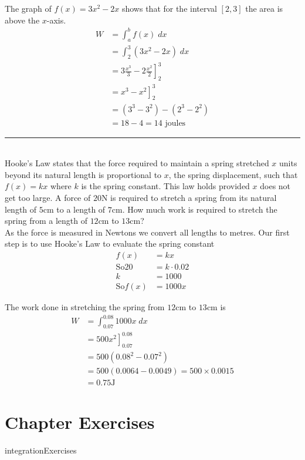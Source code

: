 \solution The graph of $f (x) =3 x^{2} -2 x$ shows that for the interval $\left [2 ,3\right ]$ the area is above the $x$-axis.
\begin{align*}W &  = \int _{a}^{b}f (x)\; d x \\
 &  = \int _{2}^{3}\left (3 x^{2} -2 x\right )\; d x \\
 &  = \left .3 \frac{x^{3}}{3} -2 \frac{x^{2}}{2}\right ]_{2}^{3} \\
 &  = \left .x^{3} -x^{2}\right ]_{2}^{3} \\
 &  = \left (3^{3} -3^{2}\right ) -\left (2^{3} -2^{2}\right ) \\
 &  = 18 -4 =14\text{ joules}\end{align*}
\rule{6.8cm}{0.5pt}\\
\example Hooke's Law states that the force required to maintain a spring stretched $x$ units beyond its natural length is proportional to $x$, the spring displacement, such that $f (x) =k x$ where $k$ is the spring constant. This law holds provided $x$ does not get too large. A force of $20 \mbox{N}$ is required to stretch a spring from its natural length of $5 \mbox{cm}$ to a length of $7 \mbox{cm}$. How much work is required to stretch the spring from a length of $12 \mbox{cm}$ to $13 \mbox{cm}$? \\

\solution As the force is measured in Newtons we convert all lengths to metres. Our first step is to use Hooke's Law to evaluate the spring constant
\begin{align*}f (x) &  = k x \\
\text{So}20 &  = k \cdot 0.02 \\
k &  = 1000 \\
\text{So}f (x) &  = 1000 x\end{align*}

The work done in stretching the spring from $12 \mbox{cm}$ to $13 \mbox{cm}$ is
\begin{align*}W &  = \int _{0.07}^{0.08}1000 x\; d x \\
 &  = \left .500 x^{2}\right ]_{0.07}^{0.08} \\
 &  = 500 \left (0.08^{2} -0.07^{2}\right ) \\
 &  = 500 \left (0.0064 -0.0049\right ) =500 \times 0.0015 \\
 &  = 0.75\text{}\mbox{J}\end{align*}

\clearpage
\section{Chapter Exercises}
{integrationExercises}


 



